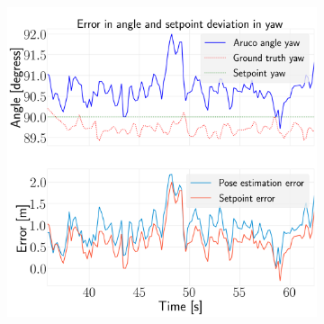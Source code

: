 \documentclass[../Head/report.tex]{subfiles}
\begin{document}
\begin{figure}[H]
\begin{subfigure}[t]{.30\textwidth}
        \caption{}
        \label{fig:hold_pose_estimation_test2_pitch}
    \end{subfigure}
     \hspace{0.2em}
    \begin{subfigure}[t]{.30\textwidth}
        \centering
        \includegraphics[width=\textwidth]{../Figures/hold_pose_using_aruco_pose_estimation/test2_gps2visionBoard_1.0Wind_-1.0y/error_yaw/pose_error_yaw_test1.png}
        \caption{}
        \label{fig:hold_pose_estimation_test2_yaw}
    \end{subfigure}
    \caption{}
    \label{fig:hold_pose_estimation_test2_error_angle}
\end{figure}
\end{document}
